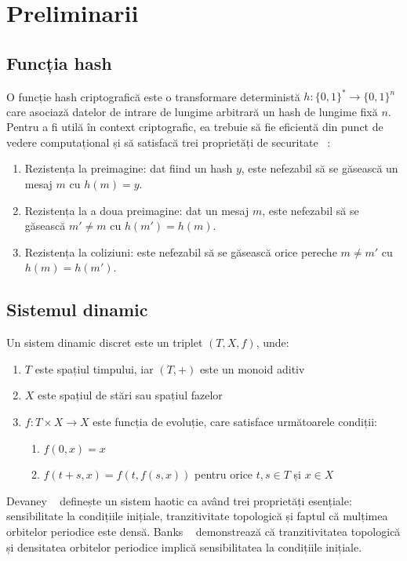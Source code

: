 \section{Preliminarii}

\subsection{Funcția hash}

O funcție hash criptografică este o transformare deterministă $h \colon \{0,1\}^* \to \{0,1\}^n$ care asociază datelor de intrare de lungime arbitrară un hash de lungime fixă $n$.
Pentru a fi utilă în context criptografic, ea trebuie să fie eficientă din punct de vedere computațional și să satisfacă trei proprietăți de securitate ~\cite{merkle1989, damgard1989}: 
\begin{enumerate}
    \item Rezistența la preimagine: dat fiind un hash $y$, este nefezabil să se găsească un mesaj $m$ cu $h(m) = y$.
    \item Rezistența la a doua preimagine: dat un mesaj $m$, este nefezabil să se găsească $m' \neq m$ cu $h(m') = h(m)$.
    \item Rezistența la coliziuni: este nefezabil să se găsească orice pereche $m \neq m'$ cu $h(m) = h(m')$.
\end{enumerate}

\subsection{Sistemul dinamic}

Un sistem dinamic discret este un triplet $(T, X, f)$, unde:
\begin{enumerate}
    \item $T$ este spațiul timpului, iar $(T, +)$ este un monoid aditiv
    \item $X$ este spațiul de stări sau spațiul fazelor
    \item $f \colon T \times X \to X$ este funcția de evoluție, care satisface următoarele condiții:
    \begin{enumerate}
        \item $f(0, x) = x$
        \item $f(t+s, x) = f(t, f(s, x))$ pentru orice $t, s \in T$ și $x \in X$
    \end{enumerate}
\end{enumerate}
Devaney ~\cite{devaney1989} definește un sistem haotic ca având trei proprietăți esențiale: sensibilitate la condițiile inițiale, tranzitivitate topologică și faptul că mulțimea orbitelor periodice este densă. 
Banks ~\cite{banks1992} demonstrează că tranzitivitatea topologică și densitatea orbitelor periodice implică sensibilitatea la condițiile inițiale. \\

